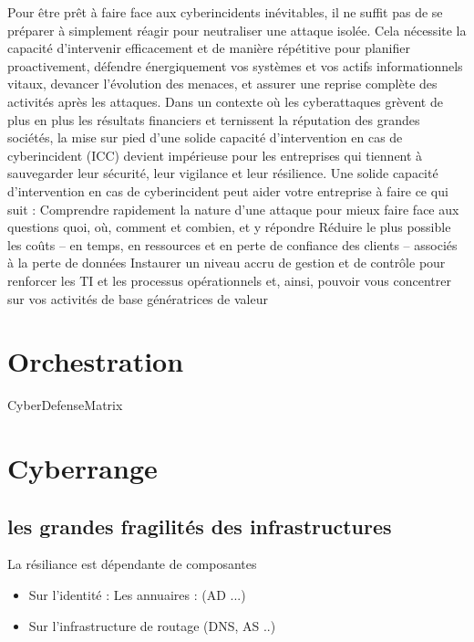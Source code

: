 



Pour être prêt à faire face aux cyberincidents inévitables, il ne suffit pas de se préparer à simplement réagir pour neutraliser une attaque isolée. Cela nécessite la capacité d’intervenir efficacement et de manière répétitive pour planifier proactivement, défendre énergiquement vos systèmes et vos actifs informationnels vitaux, devancer l’évolution des menaces, et assurer une reprise complète des activités après
les attaques.
Dans un contexte où les cyberattaques grèvent de plus en plus les résultats financiers et ternissent la réputation des grandes sociétés, la mise sur pied d’une solide capacité d’intervention en cas de cyberincident (ICC) devient impérieuse pour les entreprises qui tiennent à sauvegarder leur sécurité, leur vigilance et leur résilience. Une solide capacité d’intervention en cas de cyberincident peut aider votre entreprise à faire ce qui suit :
Comprendre rapidement la nature d’une attaque pour mieux faire face aux questions quoi, où, comment et combien, et y répondre
Réduire le plus possible les coûts – en temps, en ressources et en perte de confiance des clients – associés à la perte de données
Instaurer un niveau accru de gestion et de contrôle pour renforcer les TI et les processus opérationnels et, ainsi, pouvoir vous concentrer sur vos activités de base génératrices de valeur

\section{Orchestration}

CyberDefenseMatrix  \cite{dutta2019cyber}

\section{Cyberrange}



\subsection {les grandes fragilités des infrastructures}

La résiliance est dépendante de composantes 
\begin{itemize}
  \item Sur l'identité : Les annuaires : (AD ...)
  \item Sur l'infrastructure de routage (DNS, AS ..)
\end{itemize}


